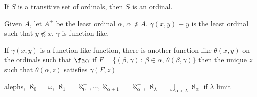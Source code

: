 \begin{lemma}
    If $S$ is a transitive set of ordinals, then $S$ is an ordinal. 
\end{lemma}

\noindent
Given $A$, let $A^+$ be the least ordinal $\alpha$, $\alpha \not\preceq A$. $\gamma(x,y) \equiv y$ is the least ordinal such that $y \not\preceq x$. $\gamma$ is function like. 

\begin{theorem}
    If $\gamma(x,y)$ is a function like function, there is another function like $\theta(x,y)$ on the ordinals such that $\fa \alpha$ if $F = \{(\beta, \gamma) \, : \, \beta \in \alpha, \, \theta(\beta, \gamma)\}$ then the unique $z$ such that $\theta(\alpha, z)$ satisfies $\gamma(F, z)$ 
\end{theorem}

\begin{example}
    alephs, $\aleph_0 = \omega$, $\aleph_1 = \aleph_0^+, \cdots , \aleph_{\alpha + 1} = \aleph_{\alpha}^+$, $\aleph_{\lambda} = \bigcup_{\alpha < \lambda} \aleph_{\alpha}$ if $\lambda$ limit 
\end{example}
